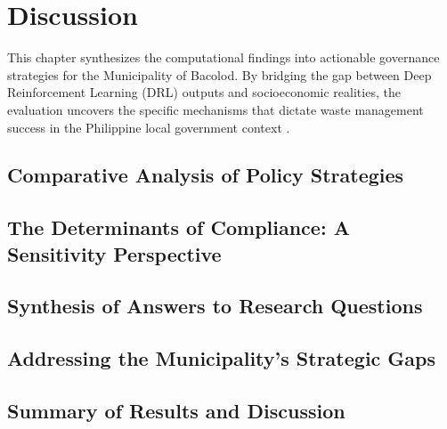 \chapter{Discussion}
This chapter synthesizes the computational findings into actionable governance strategies for the Municipality of Bacolod. By bridging the gap between Deep Reinforcement Learning (DRL) outputs and socioeconomic realities, the evaluation uncovers the specific mechanisms that dictate waste management success in the Philippine local government context \citep{Jimenez2025}.

\section{Comparative Analysis of Policy Strategies}


\section{The Determinants of Compliance: A Sensitivity Perspective}



\section{Synthesis of Answers to Research Questions}



\section{Addressing the Municipality's Strategic Gaps}



\section{Summary of Results and Discussion}

